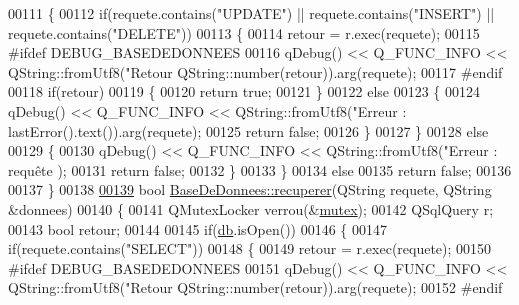 \begin{DoxyCode}
{00111     \{
00112         \textcolor{keywordflow}{if}(requete.contains(\textcolor{stringliteral}{"UPDATE"}) || requete.contains(\textcolor{stringliteral}{"INSERT"}) || requete.contains(\textcolor{stringliteral}{"DELETE"}))
00113         \{
00114             retour = r.exec(requete);
00115 \textcolor{preprocessor}{            #ifdef DEBUG\_BASEDEDONNEES}
00116             qDebug() << Q\_FUNC\_INFO << QString::fromUtf8(\textcolor{stringliteral}{"Retour %
      QString::number(retour)).arg(requete);
00117 \textcolor{preprocessor}{            #endif}
00118             \textcolor{keywordflow}{if}(retour)
00119             \{
00120                 \textcolor{keywordflow}{return} \textcolor{keyword}{true};
00121             \}
00122             \textcolor{keywordflow}{else}
00123             \{
00124                 qDebug() << Q\_FUNC\_INFO << QString::fromUtf8(\textcolor{stringliteral}{"Erreur : %
      lastError().text()).arg(requete);
00125                 \textcolor{keywordflow}{return} \textcolor{keyword}{false};
00126             \}
00127         \}
00128         \textcolor{keywordflow}{else}
00129         \{
00130             qDebug() << Q\_FUNC\_INFO << QString::fromUtf8(\textcolor{stringliteral}{"Erreur : requête %
      );
00131             \textcolor{keywordflow}{return} \textcolor{keyword}{false};
00132         \}
00133     \}
00134     \textcolor{keywordflow}{else}
00135         \textcolor{keywordflow}{return} \textcolor{keyword}{false};
00136 
00137 \}
00138 
\hyperlink{class_base_de_donnees_a77539baad389f5acf754cd2cd452403e}{00139} \textcolor{keywordtype}{bool} \hyperlink{class_base_de_donnees_a77539baad389f5acf754cd2cd452403e}{BaseDeDonnees::recuperer}(QString requete, QString &donnees)
00140 \{
00141     QMutexLocker verrou(&\hyperlink{class_base_de_donnees_aa1b4696fac87a740f914aa73739086f2}{mutex});
00142     QSqlQuery r;
00143     \textcolor{keywordtype}{bool} retour;
00144 
00145     \textcolor{keywordflow}{if}(\hyperlink{class_base_de_donnees_a3e738dcf443370c46a541677ab619f06}{db}.isOpen())
00146     \{
00147         \textcolor{keywordflow}{if}(requete.contains(\textcolor{stringliteral}{"SELECT"}))
00148         \{
00149             retour = r.exec(requete);
00150 \textcolor{preprocessor}{            #ifdef DEBUG\_BASEDEDONNEES}
00151             qDebug() << Q\_FUNC\_INFO << QString::fromUtf8(\textcolor{stringliteral}{"Retour %
      QString::number(retour)).arg(requete);
00152 \textcolor{preprocessor}{            #endif}
}}}}}
\end{DoxyCode}
